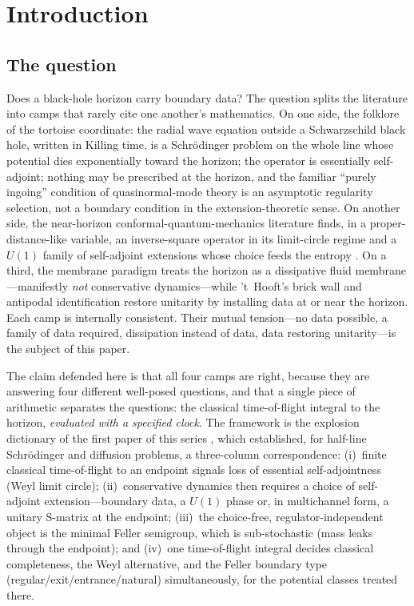 \documentclass[11pt]{article}
\theoremstyle{definition}
\theoremstyle{remark}
\begin{document}
\newpage
\tableofcontents

\section{Introduction}
\label{sec:intro}

\subsection{The question}

Does a black-hole horizon carry boundary data? The question splits the
literature into camps that rarely cite one another's mathematics. On
one side, the folklore of the tortoise coordinate: the radial wave
equation outside a Schwarzschild black hole, written in Killing time,
is a Schr\"odinger problem on the whole line whose potential dies
exponentially toward the horizon; the operator is essentially
self-adjoint; nothing may be prescribed at the horizon, and the
familiar ``purely ingoing'' condition of quasinormal-mode theory is an
asymptotic regularity selection, not a boundary condition in the
extension-theoretic sense. On another side, the near-horizon
conformal-quantum-mechanics literature finds, in a proper-distance-like
variable, an inverse-square operator in its limit-circle regime and a
$U(1)$ family of self-adjoint extensions whose choice feeds the
entropy \cite{GuptaSen2002,CamblongOrdonez2005,Balachandran2018}. On a
third, the membrane paradigm
\cite{Damour1978,ThornePriceMacdonald,ParikhWilczek1998} treats the
horizon as a dissipative fluid membrane---manifestly \emph{not}
conservative dynamics---while 't~Hooft's brick wall
\cite{tHooftBrickWall1985} and antipodal identification
\cite{tHooftAntipodal2016} restore unitarity by installing data at or
near the horizon. Each camp is internally consistent. Their mutual
tension---no data possible, a family of data required, dissipation
instead of data, data restoring unitarity---is the subject of this
paper.

The claim defended here is that all four camps are right, because they
are answering four different well-posed questions, and that a single
piece of arithmetic separates the questions: the classical
time-of-flight integral to the horizon, \emph{evaluated with a
specified clock}. The framework is the explosion dictionary of the
first paper of this series \cite{indivisible}, which established, for
half-line Schr\"odinger and diffusion problems, a three-column
correspondence: (i)~finite classical time-of-flight to an endpoint
signals loss of essential self-adjointness (Weyl limit circle);
(ii)~conservative dynamics then requires a choice of self-adjoint
extension---boundary data, a $U(1)$ phase or, in multichannel form, a
unitary S-matrix at the endpoint; (iii)~the choice-free,
regulator-independent object is the minimal Feller semigroup, which is
sub-stochastic (mass leaks through the endpoint); and (iv)~one
time-of-flight integral decides classical completeness, the Weyl
alternative, and the Feller boundary type
(regular/exit/entrance/natural) simultaneously, for the potential
classes treated there.
\end{document}
